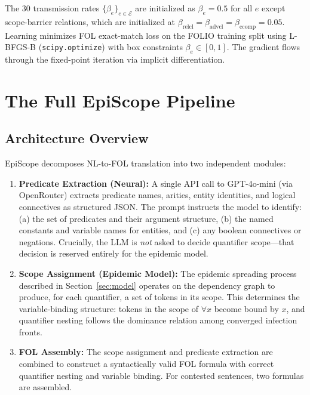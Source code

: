\documentclass[11pt,letterpaper]{article}
\begin{document}
The 30 transmission rates $\{\beta_e\}_{e \in \mathcal{E}}$ are initialized as $\beta_e = 0.5$ for all $e$
except scope-barrier relations, which are initialized at $\beta_{\text{relcl}} = \beta_{\text{advcl}} =
\beta_{\text{ccomp}} = 0.05$. Learning minimizes FOL exact-match loss on the FOLIO training split using
L-BFGS-B (\texttt{scipy.optimize}) with box constraints $\beta_e \in [0,1]$. The gradient flows through the
fixed-point iteration via implicit differentiation.

\section{The Full EpiScope Pipeline}
\label{sec:pipeline}

\subsection{Architecture Overview}

EpiScope decomposes NL-to-FOL translation into two independent modules:

\begin{enumerate}
  \item \textbf{Predicate Extraction (Neural):} A single API call to GPT-4o-mini (via OpenRouter) extracts
        predicate names, arities, entity identities, and logical connectives as structured JSON. The prompt
        instructs the model to identify: (a) the set of predicates and their argument structure, (b) the named
        constants and variable names for entities, and (c) any boolean connectives or negations. Crucially, the
        LLM is \emph{not} asked to decide quantifier scope---that decision is reserved entirely for the epidemic
        model.

  \item \textbf{Scope Assignment (Epidemic Model):} The epidemic spreading process described in
        Section~\ref{sec:model} operates on the dependency graph to produce, for each quantifier, a set of
        tokens in its scope. This determines the variable-binding structure: tokens in the scope of $\forall x$
        become bound by $x$, and quantifier nesting follows the dominance relation among converged infection
        fronts.

  \item \textbf{FOL Assembly:} The scope assignment and predicate extraction are combined to construct a
        syntactically valid FOL formula with correct quantifier nesting and variable binding. For contested
        sentences, two formulas are assembled.
\end{enumerate}
\end{document}
